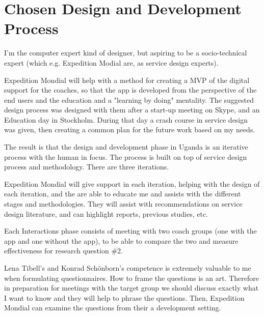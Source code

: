 \section{Chosen Design and Development Process}



I'm the computer expert kind of designer, but aspiring to be a socio-technical expert (which e.g. Expedition Modial are, as service design experts).

Expedition Mondial will help with a method for creating a MVP of the digital support for the coaches, so that the app is developed from the perspective of the end users and the education and a "learning by doing" mentality. The suggested design process was designed with them after a start-up meeting on Skype, and an Education day in Stockholm. During that day a crash course in service design was given, then creating a common plan for the future work based on my needs.

The result is that the design and development phase in Uganda is an iterative process with the human in focus. The process is built on top of service design process and methodology. There are three iterations.

Expedition Mondial will give support in each iteration, helping with the design of each iteration, and the are able to educate me and assists with the different stages and methodologies. They will assist with recommendations on service design literature, and can highlight reports, previous studies, etc.

Each Interactions phase consists of meeting with two coach groups (one with the app and one without the app), to be able to compare the two and measure effectiveness for research question \#2.

Lena Tibell's and Konrad Schönborn's  competence is extremely valuable to me when formulating questionnaires. How to frame the questions is an art.  Therefore in preparation for meetings with the target group we should discuss exactly what I want to know and they will help to phrase the questions. Then, Expedition Mondial can examine the questions from their a development setting.

